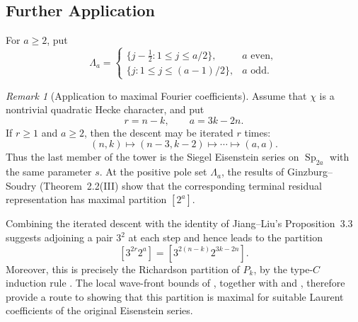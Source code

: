 \documentclass[11pt,notitlepage]{amsart}
\theoremstyle{definition}
\theoremstyle{remark}
\newtheorem{remark}[theorem]{Remark}
\DeclareMathOperator{\Sp}{Sp}
\begin{document}
\subsection{Further Application}

For $a\geq2$, put
\begin{equation}\label{eq:section5-Lambda}
 \Lambda_a=
 \begin{cases}
 \{j-\tfrac12:1\leq j\leq a/2\},&a\text{ even},\\[2pt]
 \{j:1\leq j\leq(a-1)/2\},&a\text{ odd}.
 \end{cases}
\end{equation}
\begin{remark}[Application to maximal Fourier coefficients]\label{rem:maximal-partition}
Assume that $\chi$ is a nontrivial quadratic Hecke character, and put
\[
 r=n-k,\qquad a=3k-2n.
\]
If $r\geq1$ and $a\geq2$, then the descent may be iterated $r$ times:
\[
 (n,k)\longmapsto(n-3,k-2)\longmapsto\cdots\longmapsto(a,a).
\]
Thus the last member of the tower is the Siegel Eisenstein series on
$\Sp_{2a}$ with the same parameter $s$.  At the positive pole set
$\Lambda_a$, the results of Ginzburg--Soudry (Theorem~2.2(III) \cite{GS221} show that the
corresponding terminal residual representation has maximal partition
$[2^a]$.

Combining the iterated descent with the identity of
Jiang--Liu's Proposition~3.3 \cite{JL15} suggests adjoining a pair
$3^2$ at each step and hence leads to the partition
\[
 [3^{2r}2^a]=[3^{2(n-k)}2^{3k-2n}].
\]
Moreover, this is precisely the Richardson partition of $P_k$, by the
type-$C$ induction rule
\cite[Corollary~7.3.4(ii)]{CM93}. The local wave-front bounds of
\cite{CK25}, together with \cite{Lapid08} and \cite{GGS17}, therefore provide a route to showing that this partition is maximal for suitable Laurent coefficients of the original Eisenstein series.
\end{remark}
\end{document}
